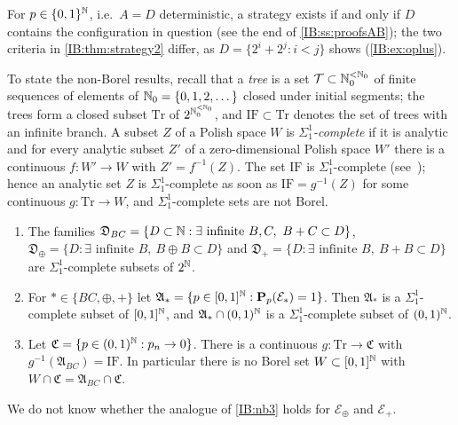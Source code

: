 For $p\in\{0,1\}^{\mathbb{N}}$, i.e.\ $A=D$ deterministic, a strategy exists if and only if $D$
contains the configuration in question (see the end of \cref{IB:ss:proofsAB}); the
two criteria in \cref{IB:thm:strategy2} differ, as $D=\{2^i+2^j:i<j\}$ shows
(\cref{IB:ex:oplus}).

To state the non-Borel results, recall that a \emph{tree} is a set
$\mathcal T\subset\mathbb{N}_0^{<\mathbb{N}_0}$ of finite sequences of elements of $\mathbb{N}_0=\{0,1,2,\dots\}$ closed
under initial segments; the trees form a closed subset $\mathrm{Tr}$ of
$2^{\mathbb{N}_0^{<\mathbb{N}_0}}$, and $\mathrm{IF}\subset\mathrm{Tr}$ denotes the set of trees with an infinite
branch. A subset $Z$ of a Polish space $W$ is \emph{$\Sigma^1_1$-complete} if it is
analytic and for every analytic subset $Z'$ of a zero-dimensional Polish space $W'$
there is a continuous $f\colon W'\to W$ with $Z'=f^{-1}(Z)$. The set $\mathrm{IF}$ is
$\Sigma^1_1$-complete (see~\cite[Theorem~27.1]{kechris1995classical}); hence an analytic set
$Z$ is $\Sigma^1_1$-complete as soon as $\mathrm{IF}=g^{-1}(Z)$ for some continuous
$g\colon\mathrm{Tr}\to W$, and $\Sigma^1_1$-complete sets are not Borel.

\begin{theorem}
\label{IB:thm:nonborel}
\begin{enumerate}[label=\textup{(\alph*)}]
\item\label{IB:nb1} The families
$\mathfrak D_{BC}=\{D\subset\mathbb{N}:\exists\text{ infinite }B,C,\ B+C\subset D\}$,
$\mathfrak D_\oplus=\{D:\exists\text{ infinite }B,\ B\oplus B\subset D\}$ and
$\mathfrak D_+=\{D:\exists\text{ infinite }B,\ B+B\subset D\}$ are $\Sigma^1_1$-complete subsets of $2^{\mathbb{N}}$.
\item\label{IB:nb2} For $\ast\in\{BC,\oplus,+\}$ let
$\mathfrak A_\ast=\{p\in[0,1]^{\mathbb{N}}:\mathbf P_p(\mathcal E_\ast)=1\}$. Then $\mathfrak A_\ast$ is a
$\Sigma^1_1$-complete subset of $[0,1]^{\mathbb{N}}$, and $\mathfrak A_\ast\cap(0,1)^{\mathbb{N}}$ is a
$\Sigma^1_1$-complete subset of $(0,1)^{\mathbb{N}}$.
\item\label{IB:nb3} Let $\mathfrak C=\{p\in(0,1)^{\mathbb{N}}:p_n\to0\}$. There is a continuous
$g\colon\mathrm{Tr}\to\mathfrak C$ with $g^{-1}(\mathfrak A_{BC})=\mathrm{IF}$. In particular there is
no Borel set $W\subset[0,1]^{\mathbb{N}}$ with $W\cap\mathfrak C=\mathfrak A_{BC}\cap\mathfrak C$.
\end{enumerate}
\end{theorem}

We do not know whether the analogue of \ref{IB:nb3} holds for $\mathcal E_\oplus$ and $\mathcal E_+$.

